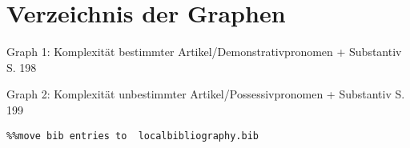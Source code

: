 \chapter{Verzeichnis der Graphen}\label{appendix4}

Graph 1: Komplexität bestimmter Artikel/Demonstrativpronomen + Substantiv  S. 198

Graph 2: Komplexität unbestimmter Artikel/Possessivpronomen + Substantiv  S. 199


\begin{verbatim}%%move bib entries to  localbibliography.bib
\end{verbatim}